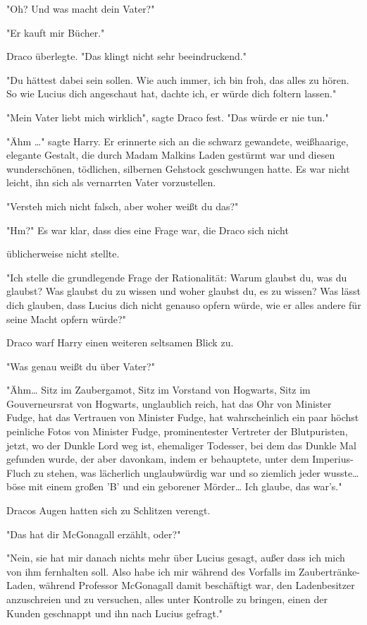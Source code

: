 {"Oh? Und was macht dein Vater?"

"Er kauft mir Bücher."

Draco überlegte. "Das klingt nicht sehr beeindruckend."

"Du hättest dabei sein sollen. Wie auch immer, ich bin froh, das alles zu hören. So wie Lucius dich angeschaut hat, dachte ich, er würde dich foltern lassen."

"Mein Vater liebt mich wirklich", sagte Draco fest. "Das würde er nie tun."

"Ähm …" sagte Harry. Er erinnerte sich an die schwarz gewandete, weißhaarige, elegante Gestalt, die durch Madam Malkins Laden gestürmt war und diesen wunderschönen, tödlichen, silbernen Gehstock geschwungen hatte. Es war nicht leicht, ihn sich als vernarrten Vater vorzustellen.

"Versteh mich nicht falsch, aber woher weißt du das?"

"Hm?" Es war klar, dass dies eine Frage war, die Draco sich nicht

üblicherweise nicht stellte.

"Ich stelle die grundlegende Frage der Rationalität: Warum glaubst du, was du glaubst? Was glaubst du zu wissen und woher glaubst du, es zu wissen? Was lässt dich glauben, dass Lucius dich nicht genauso opfern würde, wie er alles andere für seine Macht opfern würde?"

Draco warf Harry einen weiteren seltsamen Blick zu.

"Was genau weißt du über Vater?"

"Ähm… Sitz im Zaubergamot, Sitz im Vorstand von Hogwarts, Sitz im Gouverneursrat von Hogwarts, unglaublich reich, hat das Ohr von Minister Fudge, hat das Vertrauen von Minister Fudge, hat wahrscheinlich ein paar höchst peinliche Fotos von Minister Fudge, prominentester Vertreter der Blutpuristen, jetzt, wo der Dunkle Lord weg ist, ehemaliger Todesser, bei dem das Dunkle Mal gefunden wurde, der aber davonkam, indem er behauptete, unter dem Imperius-Fluch zu stehen, was lächerlich unglaubwürdig war und so ziemlich jeder wusste… böse mit einem großen 'B' und ein geborener Mörder… Ich glaube, das war's."

Dracos Augen hatten sich zu Schlitzen verengt.

"Das hat dir McGonagall erzählt, oder?"

"Nein, sie hat mir danach nichts mehr über Lucius gesagt, außer dass ich mich von ihm fernhalten soll. Also habe ich mir während des Vorfalls im Zaubertränke-Laden, während Professor McGonagall damit beschäftigt war, den Ladenbesitzer anzuschreien und zu versuchen, alles unter Kontrolle zu bringen, einen der Kunden geschnappt und ihn nach Lucius gefragt."

}
